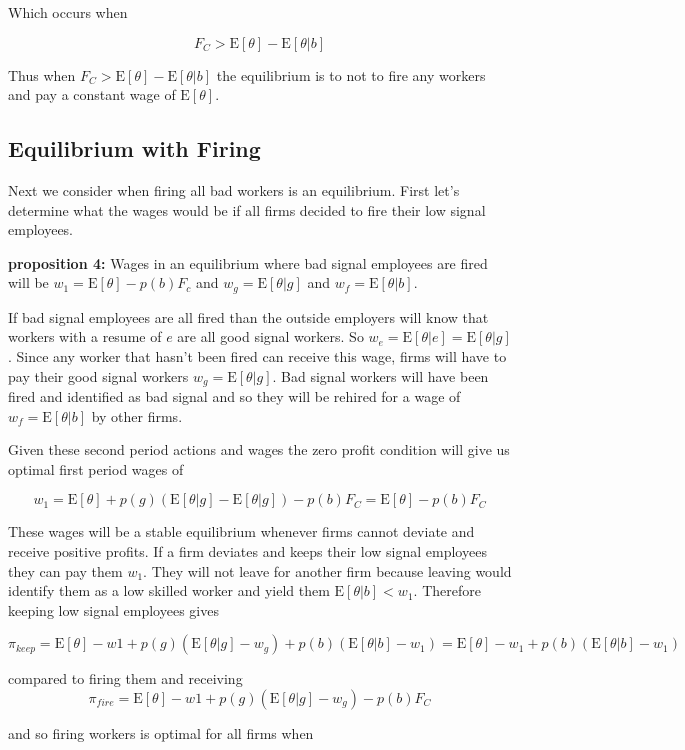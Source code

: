 \documentclass[11pt]{article}
\newcommand{\E}{\mathrm{E}}
\begin{document}
Which occurs when 

$$F_C > \E[\theta] - \E[\theta |b]$$

Thus when  $F_C > \E[\theta] - \E[\theta |b]$ the equilibrium is to not to fire any workers and pay a constant wage of $\E[\theta]$.

\subsection{Equilibrium with Firing}

Next we consider when firing all bad workers is an equilibrium. First let's determine what the wages would be if all firms decided to fire their low signal employees. 

\textbf{proposition 4:} Wages in an equilibrium where bad signal employees are fired will be $w_1 = \E[\theta] - p(b)F_c$ and $ w_g = \E[\theta|g]$ and $w_f = \E[\theta|b]$. 

If bad signal employees are all fired than the outside employers will know that workers with a resume of $e$ are all good signal workers. So $w_e = \E[\theta|e] = \E[\theta|g]$. Since any worker that hasn't been fired can receive this wage, firms will have to pay their good signal workers $w_g = \E[\theta | g]$. Bad signal workers will have been fired and identified as bad signal and so they will be rehired for a wage of $w_f = \E[\theta | b]$ by other firms. \par

Given these second period actions and wages the zero profit condition will give us optimal first period wages of 

		$$w_1 = \E[\theta] + p(g)(\E[\theta|g] - \E[\theta|g]) - p(b) F_C = \E[\theta] - p(b) F_C$$
		
These wages will be a stable equilibrium whenever firms cannot deviate and receive positive profits. If a firm deviates and keeps their low signal employees they can pay them $w_1$. They will not leave for another firm because leaving would identify them as a low skilled worker and yield them $\E[\theta|b] < w_1$. Therefore keeping low signal employees gives 

$$\pi_{keep} = \E[\theta] - w1 + p(g)(\E[\theta|g] - w_g) + p(b)(\E[\theta|b] - w_1 ) = \E[\theta] - w_1 + p(b)(\E[\theta|b] - w_1)$$

compared to firing them and receiving 
$$\pi_{fire} = \E[\theta] - w1 + p(g)(\E[\theta|g] - w_g) - p(b)F_C $$

and so firing workers is optimal for all firms when 
\end{document}
